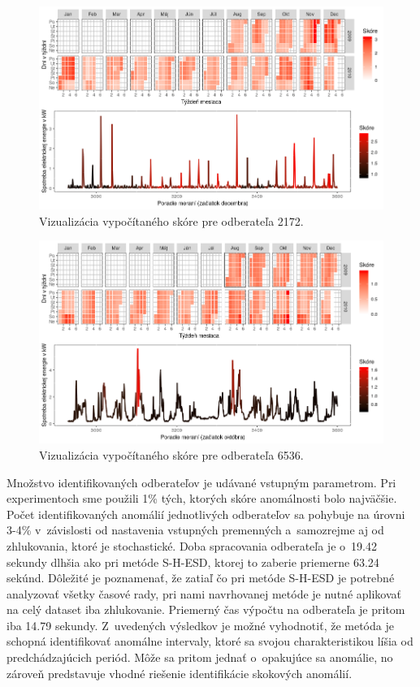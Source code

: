\documentclass[a4paper,twoside,slovak,12pt,appendix]{article}
\begin{document}
\begin{figure}[htbp]
  \centering
  \includegraphics[width=\textwidth]{results_my_2172.png}
  \caption{Vizualizácia vypočítaného skóre pre odberateľa 2172.}
	\label{fig:results-my-2172}
\end{figure}

\begin{figure}[htbp]
  \centering
  \includegraphics[width=\textwidth]{results_my_6536.png}
  \caption{Vizualizácia vypočítaného skóre pre odberateľa 6536.}
	\label{fig:results-my-6536}
\end{figure}

\noindent
Množstvo identifikovaných odberateľov je udávané vstupným parametrom. Pri
experimentoch sme použili 1\% tých, ktorých skóre anomálnosti bolo najväčšie.
Počet identifikovaných anomálií jednotlivých odberateľov sa pohybuje na úrovni
3-4\% v~závislosti od nastavenia vstupných premenných a~samozrejme aj od
zhlukovania, ktoré je stochastické. Doba spracovania odberateľa je o~19.42
sekundy dlhšia ako pri metóde S-H-ESD, ktorej to zaberie priemerne 63.24
sekúnd. Dôležité je poznamenať, že zatiaľ čo pri metóde S-H-ESD je potrebné
analyzovať všetky časové rady, pri nami navrhovanej metóde je nutné aplikovať
na celý dataset iba zhlukovanie. Priemerný čas výpočtu na odberateľa je pritom
iba 14.79 sekundy. Z~uvedených výsledkov je možné vyhodnotiť, že metóda je
schopná identifikovať anomálne intervaly, ktoré sa svojou charakteristikou líšia
od predchádzajúcich periód. Môže sa pritom jednať o~opakujúce sa anomálie, no
zároveň predstavuje vhodné riešenie identifikácie skokových anomálií.
\end{document}
